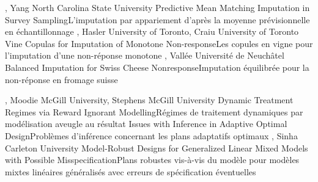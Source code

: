 
{
,  {Yang}
{North Carolina State University}
}
{Predictive Mean Matching Imputation in Survey Sampling}{L'imputation par appariement d'après la moyenne prévisionnelle en échantillonnage}
{\bubbleE \enspace \screenE}
{
,  {Hasler}
{University of Toronto},  {Craiu}
{University of Toronto}
}
{Vine Copulas for Imputation of Monotone Non-response}{Les copules en vigne pour l'imputation d'une non-réponse monotone}
{\bubbleE \enspace \screenF}
{
,  {Vallée}
{Université de Neuchâtel}
}
{Balanced Imputation for Swiss Cheese Nonresponse}{Imputation équilibrée pour la non-réponse en fromage suisse}
{\bubbleE \enspace \screenE}


{
,  {Moodie}
{McGill University},  {Stephens}
{McGill University}
}
{Dynamic Treatment Regimes via Reward Ignorant Modelling}{Régimes de traitement dynamiques par modélisation aveugle au résultat}
{\bubbleE \enspace \screenE}
{
}
{Issues with Inference in Adaptive Optimal Design}{Problèmes d’inférence concernant les plans adaptatifs optimaux}
{\bubbleE \enspace \screenE}
{
,  {Sinha}
{Carleton University}
}
{Model-Robust Designs for Generalized Linear Mixed Models with Possible Misspecification}{Plans robustes vis-à-vis du modèle pour modèles mixtes linéaires généralisés avec erreurs de spécification éventuelles}
{\bubbleE \enspace \screenE}



